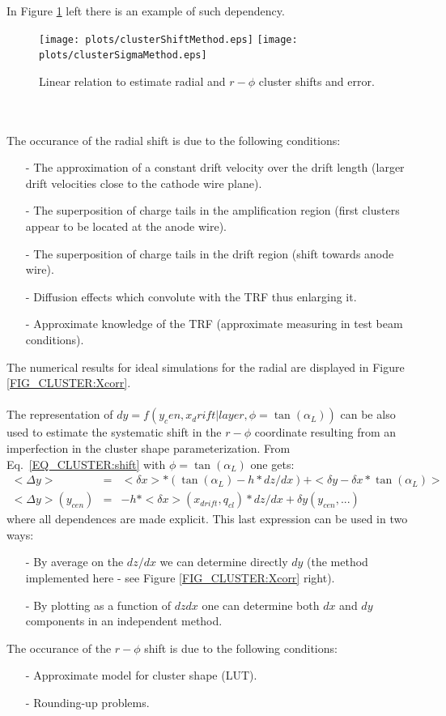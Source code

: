 \documentclass{alicetdr}
\begin{document}
In Figure \ref{FIG_CLUSTER:shift} left there is an example of such dependency.
\begin{figure}[htb]
\begin{center}
\texttt{[image: plots/clusterShiftMethod.eps]}
\texttt{[image: plots/clusterSigmaMethod.eps]}
\end{center}
\caption{
Linear relation to estimate radial and $r-\phi$ cluster shifts and error.}
\label{FIG_CLUSTER:shift}
\end{figure}
\\
\\
The occurance of the radial shift is due to the following conditions:
\begin{itemize}
  \item[-] The approximation of a constant drift velocity over the drift length
           (larger drift velocities close to the cathode wire plane).
  \item[-] The superposition of charge tails in the amplification region (first
           clusters appear to be located at the anode wire).
  \item[-] The superposition of charge tails in the drift region (shift towards
           anode wire).
  \item[-] Diffusion effects which convolute with the TRF thus enlarging it.
  \item[-] Approximate knowledge of the TRF (approximate measuring in test beam
           conditions).
\end{itemize}
The numerical results for ideal simulations for the radial are displayed in
Figure \ref{FIG_CLUSTER:Xcorr}.
\\
\\
The representation of $dy=f(y_cen, x_drift| layer, \phi=\tan(\alpha_L))$ can be
also used to estimate the systematic shift in the $r-\phi$ coordinate resulting
from an imperfection in the cluster shape parameterization. From
Eq.~\ref{EQ_CLUSTER:shift} with $\phi=\tan(\alpha_L)$ one gets:
\begin{eqnarray}
<\Delta y>&=& <\delta x> * (\tan(\alpha_{L})-h*dz/dx) + <\delta y - \delta x * \tan(\alpha_{L})>\\
<\Delta y>(y_{cen})&=& -h*<\delta x>(x_{drift}, q_{cl}) * dz/dx + \delta y(y_{cen}, ...)
\end{eqnarray}
where all dependences are made explicit. This last expression can be used in two ways:
\begin{itemize}
  \item[-] By average on the $dz/dx$ we can determine directly $dy$ (the method
           implemented here - see Figure \ref{FIG_CLUSTER:Xcorr} right).
  \item[-] By plotting as a function of $dzdx$ one can determine both $dx$ and $dy$
           components in an independent method.
\end{itemize}
The occurance of the $r-\phi$ shift is due to the following conditions:
\begin{itemize}
  \item[-] Approximate model for cluster shape (LUT).
  \item[-] Rounding-up problems.
\end{itemize}
\end{document}
